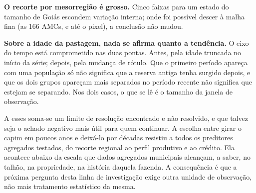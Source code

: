 \textbf{O recorte por mesorregião é grosso.} Cinco faixas para um estado do
tamanho de Goiás escondem variação interna; onde foi possível descer à malha
fina (as 166 AMCs, e até o pixel), a conclusão não mudou.

\textbf{Sobre a idade da pastagem, nada se afirma quanto a tendência.} O eixo
do tempo está comprometido nas duas pontas. Antes, pela idade truncada no
início da série; depois, pela mudança de rótulo. Que o primeiro período
apareça com uma população só não significa que a reserva antiga tenha surgido
depois, e que os dois grupos apareçam mais separados no período recente não
significa que estejam se separando. Nos dois casos, o que se lê é o tamanho da
janela de observação.

A esses soma-se um limite de resolução encontrado e não resolvido, e que
talvez seja o achado negativo mais útil para quem continuar. A escolha entre
girar o capim em poucos anos e deixá-lo por décadas resistiu a todos os
preditores agregados testados, do recorte regional ao perfil produtivo e ao
crédito. Ela acontece abaixo da escala que dados agregados municipais
alcançam, a saber, no talhão, na propriedade, na história daquela fazenda. A
consequência é que a próxima pergunta desta linha de investigação exige outra
unidade de observação, não mais tratamento estatístico da mesma.
